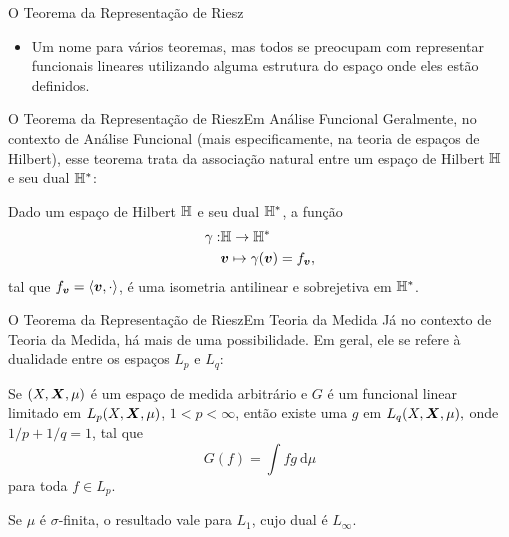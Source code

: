 \documentclass[13pt]{beamer}
\begin{document}
\begin{frame}{O Teorema da Representação de Riesz}
    \begin{itemize}
        \item Um nome para vários teoremas, mas todos se preocupam com representar funcionais lineares utilizando alguma estrutura do espaço onde eles estão definidos.
    \end{itemize}
\end{frame}

\begin{frame}{O Teorema da Representação de Riesz}{Em Análise Funcional}
    Geralmente, no contexto de Análise Funcional (mais especificamente, na teoria de espaços de Hilbert), esse teorema trata da associação natural entre um espaço de Hilbert \( \mathbb{H} \) e seu dual \( \mathbb{H}^{ * } \):
    \begin{teo*}
        Dado um espaço de Hilbert \( \mathbb{H} \) e seu dual \( \mathbb{H}^{ * } \), a função
        \begin{align*}
            \gamma : &\mathbb{H} \to \mathbb{H}^{ * } \\
                     &\bm{v} \mapsto \gamma ( \bm{v} ) = f_{ \bm{v} }
        ,\end{align*}
        tal que \( f_{ \bm{v} } = \langle\bm{v}, \cdot\rangle \), é uma isometria antilinear e sobrejetiva em \( \mathbb{H}^{ * } \).
    \end{teo*}
\end{frame}

\begin{frame}{O Teorema da Representação de Riesz}{Em Teoria da Medida}
    Já no contexto de Teoria da Medida, há mais de uma possibilidade.
    Em geral, ele se refere à dualidade entre os espaços \( L_{ p } \) e \( L_{ q } \):
    \begin{teo*}
        Se \( ( X, \bm{X}, \mu ) \) é um espaço de medida arbitrário e \( G \) é um funcional linear limitado em \( L_{ p } ( X, \bm{X}, \mu ) \), \( 1 < p < \infty \), então existe uma \( g \) em \( L_{ q } ( X, \bm{X}, \mu ), \) onde \( 1/p + 1/q = 1 \), tal que
        \begin{equation*}
            G ( f ) = \int f g \ \mathrm{d} \mu
        \end{equation*}
        para toda \( f \in L_{ p } \).
    \end{teo*}
    Se \( \mu \) é \( \sigma \)-finita, o resultado vale para \( L_{ 1 } \), cujo dual é \( L_{ \infty } \).
\end{frame}
\end{document}
